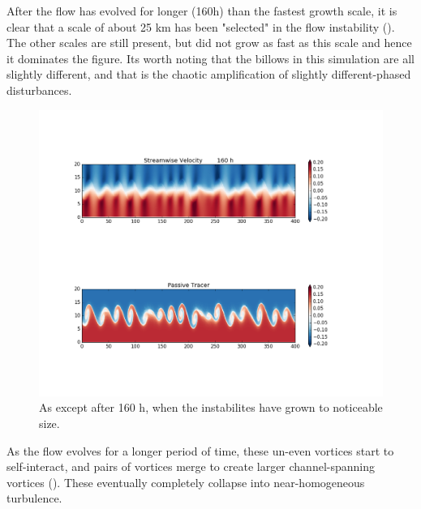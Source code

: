 \documentclass[11pt]{article}
\begin{document}
After the flow has evolved for longer (160h) than the fastest growth scale, it is clear that a scale of about 25 km has been "selected" in the flow instability ().  The other scales are still present, but did not grow as fast as this scale and hence it dominates the figure.  Its worth noting that the billows in this simulation are all slightly different, and that is the chaotic amplification of slightly different-phased disturbances.  

\begin{figure}[hbtp]
  \begin{center}
\includegraphics[width=5in]{images/ChanPar040000576000}
  \end{center}
  \caption{As  except after 160 h, when the instabilites have grown to noticeable size.}
  \label{fig:ChanPar02}
\end{figure}

\clearpage

As the flow evolves for a longer period of time, these un-even vortices start to self-interact, and pairs of vortices merge to create larger channel-spanning vortices ().  These eventually completely collapse into near-homogeneous turbulence.
\end{document}
